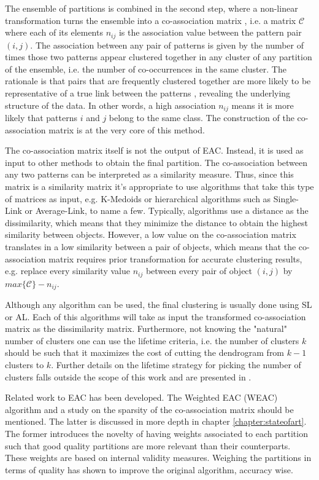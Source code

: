 The ensemble of partitions is combined in the second step, where a non-linear transformation turns the ensemble into a co-association matrix \cite{Fred2005}, i.e. a matrix $\mathcal{C}$ where each of its elements $n_{ij}$ is the association value between the pattern pair $(i,j)$.
The association between any pair of patterns is given by the number of times those two patterns appear clustered together in any cluster of any partition of the ensemble, i.e. the number of co-occurrences in the same cluster.
The rationale is that pairs that are frequently clustered together are more likely to be representative of a true link between the patterns \cite{Fred2002}, revealing the underlying structure of the data.
In other words, a high association $n_{ij}$ means it is more likely that patterns $i$ and $j$ belong to the same class.
The construction of the co-association matrix is at the very core of this method.

The co-association matrix itself is not the output of EAC.
Instead, it is used as input to other methods to obtain the final partition.
The co-association between any two patterns can be interpreted as a similarity measure.
Thus, since this matrix is a similarity matrix it's appropriate to use algorithms that take this type of matrices as input, e.g. K-Medoids or hierarchical algorithms such as Single-Link or Average-Link, to name a few.
Typically, algorithms use a distance as the dissimilarity, which means that they minimize the distance to obtain the highest similarity between objects.
However, a low value on the co-association matrix translates in a low similarity between a pair of objects, which means that the co-association matrix requires prior transformation for accurate clustering results, e.g. replace every similarity value $n_{ij}$ between every pair of object $(i,j)$ by $max \{ \mathcal{C} \} - n_{ij}$.

Although any algorithm can be used, the final clustering is usually done using SL or AL.
Each of this algorithms will take as input the transformed co-association matrix as the dissimilarity matrix.
Furthermore, not knowing the "natural" number of clusters one can use the lifetime criteria, i.e. the number of clusters $k$ should be such that it maximizes the cost of cutting the dendrogram from $k-1$ clusters to $k$.
Further details on the lifetime strategy for picking the number of clusters falls outside the scope of this work and are presented in \cite{Fred2005}.

Related work to EAC has been developed.
The Weighted EAC (WEAC) algorithm \cite{Duarte2005} and a study on the sparsity of the co-association matrix \cite{Lourenco2010} should be mentioned.
The latter is discussed in more depth in chapter \ref{chapter:stateofart}.
The former introduces the novelty of having weights associated to each partition such that good quality partitions are more relevant than their counterparts.
These weights are based on internal validity measures.
Weighing the partitions in terms of quality has shown to improve the original algorithm, accuracy wise.

